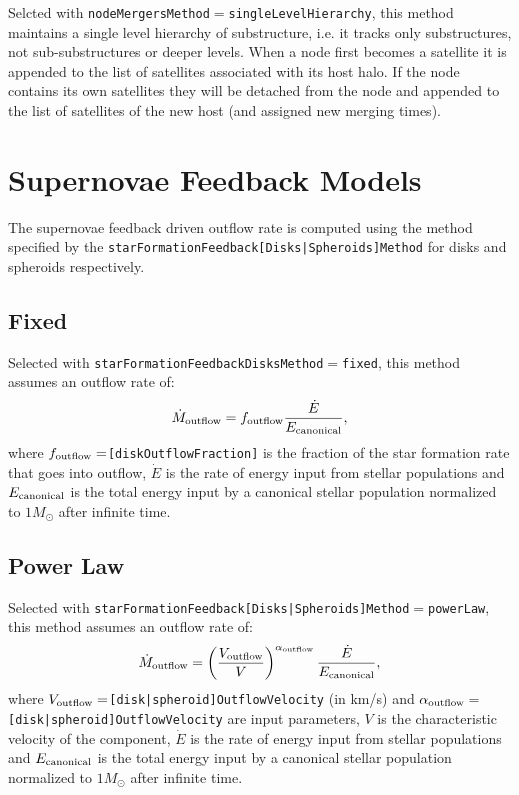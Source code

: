 Selcted with {\tt nodeMergersMethod}$=${\tt singleLevelHierarchy}, this method maintains a single level hierarchy of substructure, i.e. it tracks only substructures, not sub-substructures or deeper levels. When a \gls{node} first becomes a satellite it is appended to the list of satellites associated with its host halo. If the \gls{node} contains its own satellites they will be detached from the \gls{node} and appended to the list of satellites of the new host (and assigned new merging times).

\section{Supernovae Feedback Models}\label{sec:sneFeedback}

The supernovae feedback driven outflow rate is computed using the method specified by the {\tt starFormationFeedback[Disks|Spheroids]Method} for disks and spheroids respectively.

\subsection{Fixed}

Selected with {\tt starFormationFeedbackDisksMethod}$=${\tt fixed}, this method assumes an outflow rate of:
\begin{equation}
 \dot{M}_{\rm outflow} = f_{\rm outflow} {\dot{E} \over E_{\rm canonical}},
\end{equation}
where $f_{\rm outflow}=${\tt [diskOutflowFraction]} is the fraction of the star formation rate that goes into outflow, $\dot{E}$ is the rate of energy input from stellar populations and $E_{\rm canonical}$ is the total energy input by a canonical stellar population normalized to $1 M_\odot$ after infinite time.

\subsection{Power Law}

Selected with {\tt starFormationFeedback[Disks|Spheroids]Method}$=${\tt powerLaw}, this method assumes an outflow rate of:
\begin{equation}
 \dot{M}_{\rm outflow} = \left({V_{\rm outflow} \over V}\right)^{\alpha_{\rm outflow}} {\dot{E} \over E_{\rm canonical}},
\end{equation}
where $V_{\rm outflow}=${\tt [disk|spheroid]OutflowVelocity} (in km/s) and $\alpha_{\rm outflow}=${\tt [disk|spheroid]OutflowVelocity} are input parameters, $V$ is the characteristic velocity of the component, $\dot{E}$ is the rate of energy input from stellar populations and $E_{\rm canonical}$ is the total energy input by a canonical stellar population normalized to $1 M_\odot$ after infinite time.

